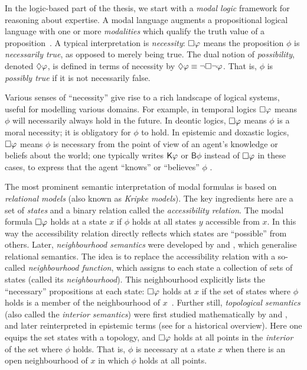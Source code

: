 {



In the logic-based part of the thesis, we start with a \emph{modal logic}
framework for reasoning about expertise. A modal language augments a
propositional logical language with one or more \emph{modalities} which qualify
the truth value of a proposition~\cite{seplogicmodal}. A typical interpretation
is \emph{necessity}: $\Box\varphi$ means the proposition $\phi$ is
\emph{necessarily true}, as opposed to merely being true. The dual notion of
\emph{possibility}, denoted $\Diamond\varphi$, is defined in terms of necessity
by $\Diamond\varphi \equiv \neg\Box\neg\varphi$. That is, $\phi$ is
\emph{possibly true} if it is not necessarily false.

Various senses of ``necessity'' give rise to a rich landscape of logical
systems, useful for modelling various domains. For example, in temporal logics
$\Box\varphi$ means $\phi$ will necessarily always hold in the future. In
deontic logics, $\Box\varphi$ means $\phi$ is a moral necessity; it is
obligatory for $\phi$ to hold. In epistemic and doxastic logics,
$\Box\varphi$ means $\phi$ is necessary from the point of view of an agent's
knowledge or beliefs about the world; one typically writes $\mathsf{K}\varphi$ or
$\mathsf{B}\phi$ instead of $\Box\varphi$ in these cases, to express that the
agent ``knows'' or ``believes'' $\phi$ .

The most prominent semantic interpretation of modal formulas is based on
\emph{relational models} (also known as \emph{Kripke models}). The key
ingredients here are a set of \emph{states} and a binary relation called the
\emph{accessibility relation}. The modal formula $\Box\varphi$ holds at a
state $x$ if $\phi$ holds at all states $y$ accessible from $x$.\footnotemark{}
In this way the accessibility relation directly reflects which states are
``possible'' from others.
%
Later, \emph{neighbourhood semantics} were developed by \textcite{Scott1970}
and \textcite{montague1970universal}, which generalise relational semantics.
The idea is to replace the accessibility relation with a so-called
\emph{neighbourhood function}, which assigns to each state a collection of sets
of states (called its \emph{neighbourhood}). This neighbourhood explicitly
lists the ``necessary'' propositions at each state: $\Box\varphi$ holds at
$x$ if the set of states where $\phi$ holds is a member of the neighbourhood of
$x$~\cite{pacuit2017neighborhood}.
%
Further still, \emph{topological semantics} (also called the \emph{interior
semantics}) were first studied mathematically by \textcite{mckinsey41} and
\textcite{mckinseytarski44}, and later reinterpreted in epistemic terms (see
\textcite[Chapter 1]{ozgun_evidence} for a historical overview). Here one
equips the set states with a topology, and $\Box\varphi$ holds at all points
in the \emph{interior} of the set where $\phi$ holds. That is, $\phi$ is
necessary at a state $x$ when there is an open neighbourhood of $x$ in which
$\phi$ holds at all points.

}

